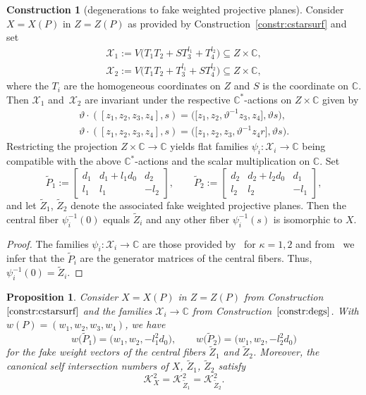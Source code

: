\documentclass[10pt,a4paper]{amsart}
\newtheorem{prop}[thm]{Proposition}
\theoremstyle{definition}
\newtheorem{constr}[thm]{Construction}
\def\CC{{\mathbb C}}
\begin{document}
\begin{constr}[degenerations to fake weighted projective planes]
\label{constr:degs}
Consider $X=X(P)$ in $Z=Z(P)$ as provided by
Construction~\ref{constr:cstarsurf}
and set
\begin{gather*}
\mathcal{X}_1
 :=
V\bigl(T_1T_2 + ST_3^{l_1} + T_4^{l_2}\bigr)
 \subseteq
Z \times \CC,
\\
\mathcal{X}_2
 :=
V\bigl(T_1T_2 + T_3^{l_1} + ST_4^{l_2}\bigr)
 \subseteq
Z \times \CC,
\end{gather*}
where the $T_i$ are the homogeneous coordinates
on $Z$ and $S$ is the coordinate on $\CC$.
Then $\mathcal{X}_1$ and~$\mathcal{X}_2$
are invariant under the respective $\CC^*$-actions
on $Z \times \CC$ given by
\begin{gather*}
\vartheta \cdot ([z_1,z_2,z_3,z_4],s)
 =
\bigl(\bigl[z_1,z_2,\vartheta^{-1}z_3,z_4\bigr],\vartheta s\bigr),
\\
\vartheta \cdot ([z_1,z_2,z_3,z_4],s)
 =
\bigl(\bigl[z_1,z_2,z_3,\vartheta^{-1}z_4r],\vartheta s\bigr).
\end{gather*}
Restricting the projection $Z \times \CC \to \CC$
yields flat families
$\psi_i \colon \mathcal{X}_i \to \CC$
being compatible with the above $\CC^*$-actions
and the scalar multiplication on $\CC$.
Set
\[
\tilde P_1
 :=
\begin{bmatrix}
d_1 & d_1+l_1d_0 & d_2
\\
l_1 & l_1 & -l_2
\end{bmatrix},
\qquad
\tilde P_2
 :=
\begin{bmatrix}
d_2 & d_2+l_2d_0 & d_1
\\
l_2 & l_2 & -l_1
\end{bmatrix},
\]
and let $\tilde Z_1$, $\tilde Z_2$ denote
the associated fake weighted projective planes.
Then the central fiber $\psi_i^{-1}(0)$
equals $\tilde Z_i$ and any other fiber
$\psi_i^{-1}(s)$ is isomorphic to $X$.
\end{constr}


\begin{proof}
The families $\psi_i \colon \mathcal{X}_i \to \CC$
are those provided by~\cite[Construction~4.1]{HaHaSu}
for $\kappa = 1,2$
and from~\cite[Proposition~4.6]{HaHaSu} we infer that
the $\tilde P_i$ are the generator matrices of
the central fibers.
Thus, $\psi_i^{-1}(0) = \tilde Z_i$.
\end{proof}

\begin{prop}
\label{prop:degprops}
Consider $X=X(P)$ in $Z=Z(P)$ from
Construction~$\ref{constr:cstarsurf}$
and the families $\mathcal{X}_i \to \CC$
from Construction~$\ref{constr:degs}$.
With $w(P) = (w_1,w_2,w_3,w_4)$,
we have
\[
w\bigl(\tilde P_1\bigr)
 =
\bigl(w_1, w_2, -l_1^2d_0\bigr),
\qquad
w\bigl(\tilde P_2\bigr)
 =
\bigl(w_1, w_2, -l_2^2d_0\bigr)
\]
for the fake weight vectors of the central
fibers $\tilde Z_1$ and $\tilde Z_2$.
Moreover, the canonical self intersection
numbers of $X$, $\tilde Z_1$, $\tilde Z_2$ satisfy
\[
\mathcal{K}_X^2
 =
\mathcal{K}_{\tilde Z_1}^2
 =
\mathcal{K}_{\tilde Z_2}^2.
\]
\end{prop}
\end{document}
